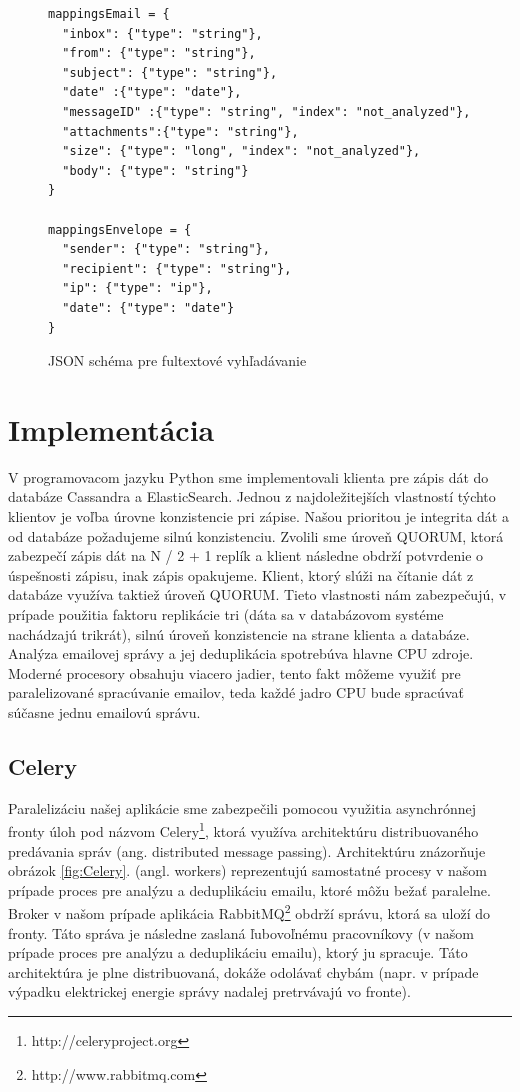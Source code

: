 \documentclass[11pt,twoside,a4paper]{book}
\begin{document}
\begin{figure}[h]
\begin{verbatim}
mappingsEmail = {
  "inbox": {"type": "string"},
  "from": {"type": "string"},
  "subject": {"type": "string"},
  "date" :{"type": "date"},
  "messageID" :{"type": "string", "index": "not_analyzed"},
  "attachments":{"type": "string"},
  "size": {"type": "long", "index": "not_analyzed"},
  "body": {"type": "string"}
}   
            
mappingsEnvelope = {
  "sender": {"type": "string"},
  "recipient": {"type": "string"},
  "ip": {"type": "ip"},
  "date": {"type": "date"}
}     
\end{verbatim}
 \caption{JSON schéma pre fultextové vyhľadávanie}
 \label{fig:ESschema}
\end{figure}      


\section{Implementácia}

V programovacom jazyku Python sme implementovali klienta pre zápis dát do databáze Cassandra a ElasticSearch. Jednou z najdoležitejších vlastností týchto klientov je voľba úrovne konzistencie pri zápise. Našou prioritou je integrita dát a od databáze požadujeme silnú konzistenciu. Zvolili sme úroveň QUORUM, ktorá zabezpečí zápis dát na N / 2 + 1 replík a klient následne obdrží potvrdenie o úspešnosti zápisu, inak zápis opakujeme. Klient, ktorý slúži na čítanie dát z databáze využíva taktiež úroveň QUORUM. Tieto vlastnosti nám zabezpečujú, v prípade použitia faktoru replikácie tri (dáta sa v databázovom systéme nachádzajú trikrát), silnú úroveň konzistencie na strane klienta a databáze. Analýza emailovej správy a jej deduplikácia spotrebúva hlavne CPU zdroje. Moderné procesory obsahuju viacero jadier, tento fakt môžeme využiť pre paralelizované spracúvanie emailov, teda každé jadro CPU bude spracúvať súčasne jednu emailovú správu.

\subsection*{Celery}
Paralelizáciu našej aplikácie sme zabezpečili pomocou využitia asynchrónnej fronty úloh pod názvom Celery\footnote{http://celeryproject.org}, ktorá využíva architektúru distribuovaného predávania správ (ang. distributed message passing). Architektúru znázorňuje obrázok \ref{fig:Celery}.  (angl. workers) reprezentujú samostatné procesy v našom prípade proces pre analýzu a deduplikáciu emailu, ktoré môžu bežať paralelne. Broker v našom prípade aplikácia RabbitMQ\footnote{http://www.rabbitmq.com} obdrží správu, ktorá sa uloží do fronty. Táto správa je následne zaslaná ľubovoľnému pracovníkovy (v našom prípade proces pre analýzu a deduplikáciu emailu), ktorý ju spracuje. Táto architektúra je plne distribuovaná, dokáže odolávať chybám (napr. v prípade výpadku elektrickej energie správy nadalej pretrvávajú vo fronte). 
\end{document}
